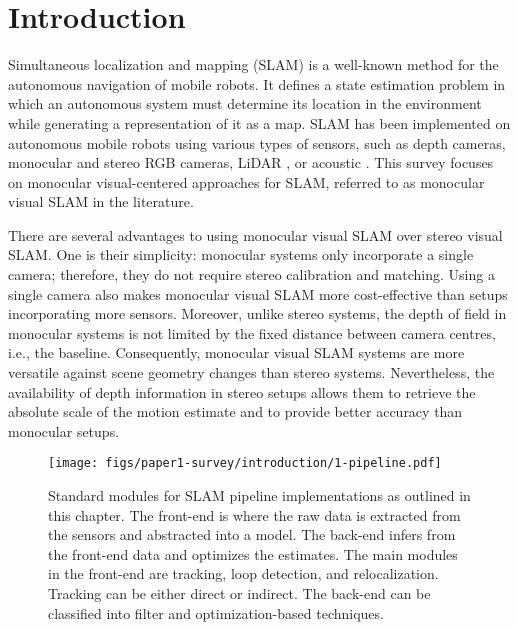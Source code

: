 \section{Introduction}
Simultaneous localization and mapping (SLAM) is a well-known method for the autonomous navigation of mobile robots. It defines a state estimation problem in which an autonomous system must determine its location in the environment while generating a representation of it as a map.
\ac{SLAM} has been implemented on autonomous mobile robots using various types of sensors, such as depth cameras, monocular and stereo RGB cameras, LiDAR \cite{intro:survey:lidarkhan2021comparative}, or acoustic \cite{intro:survey:jiang2019surveyacoustic}. This survey focuses on monocular visual-centered approaches for \ac{SLAM}, referred to as monocular visual \ac{SLAM} in the literature.


There are several advantages to using monocular visual SLAM over stereo visual SLAM. One is their simplicity: monocular systems only incorporate a single camera; therefore, they do not require stereo calibration and matching. 
Using a single camera also makes monocular visual SLAM more cost-effective than setups incorporating more sensors. Moreover, unlike stereo systems, the depth of field in monocular systems is not limited by the fixed distance between camera centres, i.e., the baseline. Consequently, monocular visual SLAM systems are more versatile against scene geometry changes than stereo systems.
Nevertheless, the availability of depth information in stereo setups allows them to retrieve the absolute scale of the motion estimate and to provide better accuracy than monocular setups.


\begin{figure*}[tbp]
\centering
\texttt{[image: figs/paper1-survey/introduction/1-pipeline.pdf]}
\caption[Outline of the SLAM modules according to the pipeline implementation]{Standard modules for SLAM pipeline implementations as outlined in this chapter. The front-end is where the raw data is extracted from the sensors and abstracted into a model. The back-end infers from the front-end data and optimizes the estimates. The main modules in the front-end are tracking, loop detection, and relocalization. Tracking can be either direct or indirect. The back-end can be classified into filter and optimization-based techniques.}
\label{fig:pipeline}
\end{figure*}
  

